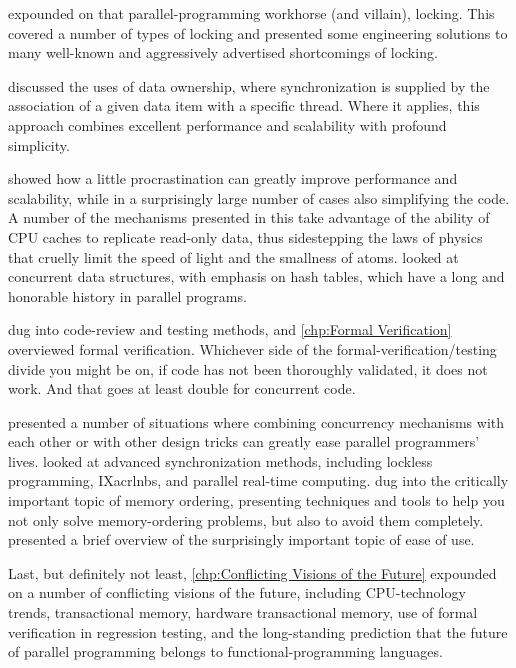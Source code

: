 expounded on that parallel-programming workhorse
(and villain), locking.
This  covered a number of types of locking
and presented some engineering solutions to many well-known and
aggressively advertised shortcomings of locking.

 discussed the uses of data ownership, where
synchronization is supplied by the association of a given data item
with a specific thread.
Where it applies, this approach combines excellent performance and
scalability with profound simplicity.

 showed how a little procrastination can
greatly improve performance and scalability, while in a surprisingly large
number of cases also simplifying the code.
A number of the mechanisms presented in this
take advantage of the ability of CPU caches to replicate read-only data,
thus sidestepping the laws of physics that cruelly limit the speed of
light and the smallness of atoms.
 looked at concurrent data structures, with
emphasis on hash tables, which have a long and honorable history in
parallel programs.

 dug into code-review and testing methods, and
\cref{chp:Formal Verification} overviewed formal verification.
Whichever side of the formal-verification/\-testing divide you might
be on, if code has not been thoroughly validated, it does not work.
And that goes at least double for concurrent code.

 presented a number of situations
where combining concurrency mechanisms with each other or with other
design tricks can greatly ease parallel programmers' lives.
 looked at advanced
synchronization methods, including lockless programming, IXacrl{nbs},
and parallel real-time computing.
 dug into the
critically important topic of memory ordering, presenting techniques
and tools to help you not only solve memory-ordering problems, but
also to avoid them completely.
 presented a brief overview of the surprisingly
important topic of ease of use.

Last, but definitely not least, \cref{chp:Conflicting Visions of the Future}
expounded on a number of conflicting visions of the future, including
CPU-technology trends, transactional memory, hardware transactional
memory, use of formal verification in regression testing, and the
long-standing prediction that the future of parallel programming belongs
to functional-programming languages.

